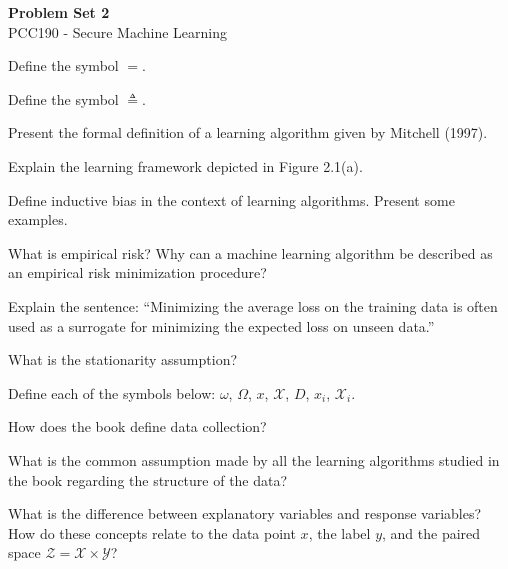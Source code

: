 \documentclass[10pt]{extarticle}
\begin{document}
\begin{center}
    {\LARGE\bfseries\color{darkblue}Problem Set 2}\\[0.3cm]
    {\large\color{accentorange} PCC190 - Secure Machine Learning}\\[0.5cm]
\end{center}


\begin{questoes}

\item Define the symbol $=$.

\item Define the symbol $\triangleq$.

\item Present the formal definition of a learning algorithm given by Mitchell (1997).

\item Explain the learning framework depicted in Figure 2.1(a).

\item Define inductive bias in the context of learning algorithms. Present some examples.

\item What is empirical risk? Why can a machine learning algorithm be described as an empirical risk minimization procedure?

\item Explain the sentence: ``Minimizing the average loss on the training data is often used as a surrogate for minimizing the expected loss on unseen data.''

\item What is the stationarity assumption?

\item Define each of the symbols below: $\omega$, $\Omega$, $x$, $\mathcal{X}$, $D$, $x_i$, $\mathcal{X}_i$.

\item How does the book define data collection?

\item What is the common assumption made by all the learning algorithms studied in the book regarding the structure of the data?

\item What is the difference between explanatory variables and response variables? How do these concepts relate to the data point $x$, the label $y$, and the paired space $\mathcal{Z} = \mathcal{X} \times \mathcal{Y}$?


\end{questoes}
\end{document}

